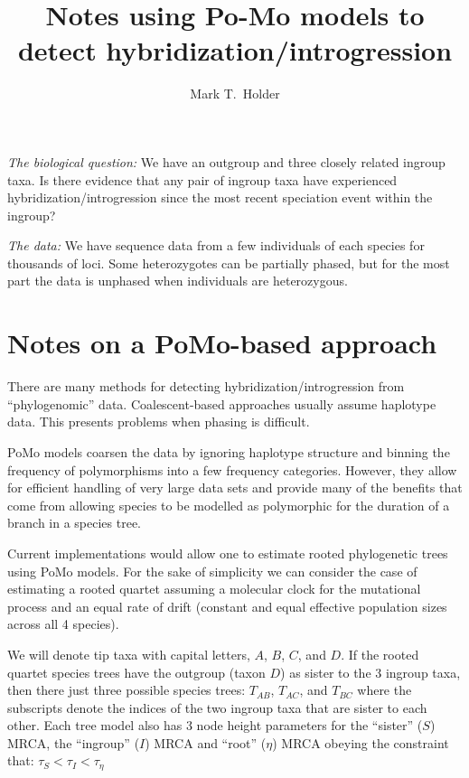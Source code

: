 \documentclass{article}
\title{Notes using Po-Mo models to detect hybridization/introgression}
\author{Mark T.~Holder}
\begin{document}
\maketitle

{\em The biological question:} We have an outgroup and three closely related ingroup taxa. Is there evidence that any pair of ingroup taxa have experienced hybridization/introgression since the most recent speciation event within the ingroup?

{\em The data:} We have sequence data from a few individuals of each species for thousands of loci.  Some heterozygotes can be partially phased, but for the most part the data is unphased when individuals are heterozygous.

\section{Notes on a PoMo-based approach}

There are many methods for detecting hybridization/introgression \citep{HibbinsHahn2021,HibbinsHahn2022} from ``phylogenomic'' data.
Coalescent-based approaches usually assume haplotype data.
This presents problems when phasing is difficult.

PoMo models \citep[see][and references therein]{DemaioSK2015,schrempf2016reversible,borges2020consistency} coarsen 
the data by ignoring haplotype structure and binning the frequency of polymorphisms into a few frequency categories.
However, they allow for efficient handling of very large data sets and provide many of the benefits that come from allowing 
species to be modelled as polymorphic for the duration of a branch in a species tree.

Current implementations would allow one to estimate rooted phylogenetic trees using PoMo models.
For the sake of simplicity we can consider the case of estimating a rooted quartet assuming a molecular clock for the mutational process and an equal rate of drift (constant and equal effective population sizes across all 4 species).

We will denote tip taxa with capital letters, $A$, $B$, $C$, and $D$.
If the rooted quartet species trees have the outgroup (taxon $D$) as sister to the 3 ingroup taxa, then there just three
possible species trees: $T_{AB}$, $T_{AC}$, and $T_{BC}$ where the subscripts denote the indices of the two ingroup
taxa that are sister to each other.
Each tree model also has 3 node height parameters for the ``sister'' ($S$) MRCA, the ``ingroup'' ($I$) MRCA and ``root'' ($\eta$) MRCA obeying the constraint that: $\tau_S < \tau_I < \tau_\eta$
\end{document}
